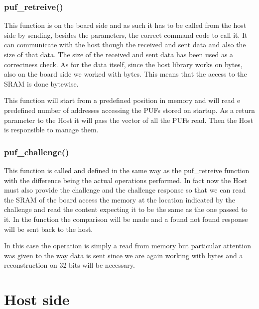 \subsubsection{puf\_retreive()}

This function is on the board side and as such it has to be called from the host side by sending, besides the parameters, the correct command code to call it. It can communicate with the host though the received and sent data and also the size of that data. The size of the received and sent data has been used as a correctness check. As for the data itself, since the host library works on bytes, also on the board side we worked with bytes. This means that the access to the SRAM is done bytewise.

This function will start from a predefined position in memory and will read e predefined number of addresses accessing the PUFs stored on startup. As a return parameter to the Host it will pass the vector of all the PUFs read. Then the Host is responsible to manage them.


\subsubsection{puf\_challenge()}

This function is called and defined in the same way as the puf\_retreive function with the difference being the actual operations performed. In fact now the Host must also provide the challenge and the challenge response so that we can read the SRAM of the board access the memory at the location indicated by the challenge and read the content expecting it to be the same as the one passed to it. In the function the comparison will be made and a found not found response will be sent back to the host.

In this case the operation is simply a read from memory but particular attention was given to the way data is sent since we are again working with bytes and a reconstruction on 32 bits will be necessary.


\section {Host side} 
\label{section:impl_host}
